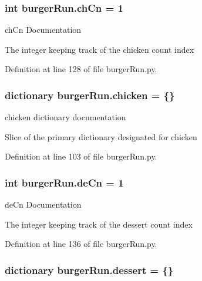 \hypertarget{namespaceburgerRun_a7dbbcfecb11ba1758b1459b2c60b3153}{
\subsubsection[{ch\-Cn}]{\setlength{\rightskip}{0pt plus 5cm}int burger\-Run.\-ch\-Cn = 1}}\label{namespaceburgerRun_a7dbbcfecb11ba1758b1459b2c60b3153}


ch\-Cn Documentation 

The integer keeping track of the chicken count index 

Definition at line 128 of file burger\-Run.\-py.

\hypertarget{namespaceburgerRun_ace33ad56f6d7c49cbec3d0dcad7f8d1e}{
\subsubsection[{chicken}]{\setlength{\rightskip}{0pt plus 5cm}dictionary burger\-Run.\-chicken = \{\}}}\label{namespaceburgerRun_ace33ad56f6d7c49cbec3d0dcad7f8d1e}


chicken dictionary documentation 

Slice of the primary dictionary designated for chicken 

Definition at line 103 of file burger\-Run.\-py.

\hypertarget{namespaceburgerRun_ae3af0174ff3a0b31f5ffa45ccc44ad4c}{
\subsubsection[{de\-Cn}]{\setlength{\rightskip}{0pt plus 5cm}int burger\-Run.\-de\-Cn = 1}}\label{namespaceburgerRun_ae3af0174ff3a0b31f5ffa45ccc44ad4c}


de\-Cn Documentation 

The integer keeping track of the dessert count index 

Definition at line 136 of file burger\-Run.\-py.

\hypertarget{namespaceburgerRun_afcabe16d554cf568c170ef56bfc06ab2}{
\subsubsection[{dessert}]{\setlength{\rightskip}{0pt plus 5cm}dictionary burger\-Run.\-dessert = \{\}}}\label{namespaceburgerRun_afcabe16d554cf568c170ef56bfc06ab2}



